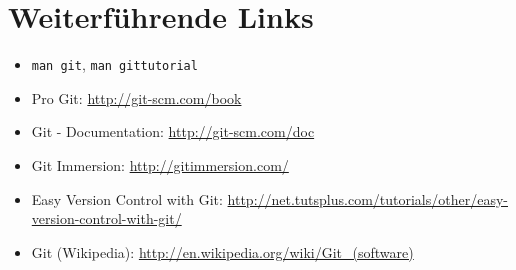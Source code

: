 \section{Weiterführende Links}
\begin{itemize}
  \item \texttt{man git}, \texttt{man gittutorial}
  \item Pro Git: \url{http://git-scm.com/book}
  \item Git - Documentation: \url{http://git-scm.com/doc}
  \item Git Immersion: \url{http://gitimmersion.com/}
  \item Easy Version Control with Git: \url{http://net.tutsplus.com/tutorials/other/easy-version-control-with-git/}
  \item Git (Wikipedia): \url{http://en.wikipedia.org/wiki/Git_(software)}
\end{itemize}
